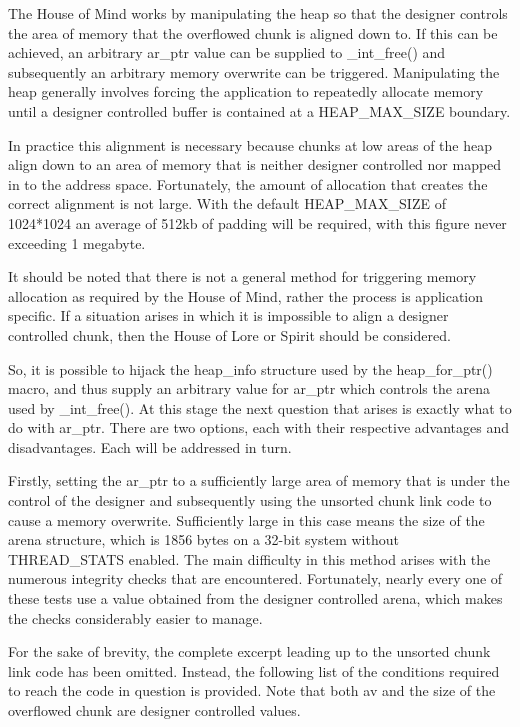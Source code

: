 \documentclass[12pt]{article}
\begin{document}
The House of Mind works by manipulating the heap so that the
designer controls the area of memory that the overflowed chunk is
aligned down to. If this can be achieved, an arbitrary ar_ptr value
can be supplied to _int_free() and subsequently an arbitrary memory
overwrite can be triggered. Manipulating the heap generally
involves forcing the application to repeatedly allocate memory
until a designer controlled buffer is contained at a HEAP_MAX_SIZE
boundary.

In practice this alignment is necessary because chunks at low areas
of the heap align down to an area of memory that is neither
designer controlled nor mapped in to the address space.
Fortunately, the amount of allocation that creates the correct
alignment is not large. With the default HEAP_MAX_SIZE of 1024*1024
an average of 512kb of padding will be required, with this figure
never exceeding 1 megabyte.

It should be noted that there is not a general method for
triggering memory allocation as required by the House of Mind,
rather the process is application specific. If a situation arises
in which it is impossible to align a designer controlled chunk,
then the House of Lore or Spirit should be considered.

So, it is possible to hijack the heap_info structure used by the
heap_for_ptr() macro, and thus supply an arbitrary value for ar_ptr
which controls the arena used by _int_free(). At this stage the
next question that arises is exactly what to do with ar_ptr. There
are two options, each with their respective advantages and
disadvantages. Each will be addressed in turn.

Firstly, setting the ar_ptr to a sufficiently large area of memory
that is under the control of the designer and subsequently using
the unsorted chunk link code to cause a memory overwrite.
Sufficiently large in this case means the size of the arena
structure, which is 1856 bytes on a 32-bit system without
THREAD_STATS enabled. The main difficulty in this method arises
with the numerous integrity checks that are encountered.
Fortunately, nearly every one of these tests use a value obtained
from the designer controlled arena, which makes the checks
considerably easier to manage.

For the sake of brevity, the complete excerpt leading up to the
unsorted chunk link code has been omitted. Instead, the following
list of the conditions required to reach the code in question is
provided. Note that both av and the size of the overflowed chunk
are designer controlled values.
\end{document}
